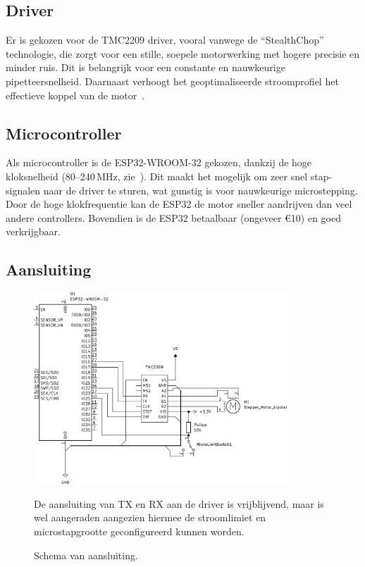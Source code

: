 \subsection{Driver}
Er is gekozen voor de TMC2209 driver, vooral vanwege de ``StealthChop'' technologie, die zorgt voor een stille, soepele motorwerking met hogere precisie en minder ruis. Dit is belangrijk voor een constante en nauwkeurige pipetteersnelheid. Daarnaast verhoogt het geoptimaliseerde stroomprofiel het effectieve koppel van de motor\ \cite{RN45}.

\subsection{Microcontroller}
Als microcontroller is de ESP32-WROOM-32 gekozen, dankzij de hoge kloksnelheid (80–240\,MHz, zie\ \cite{RN47}). Dit maakt het mogelijk om zeer snel stap-signalen naar de driver te sturen, wat gunstig is voor nauwkeurige microstepping. Door de hoge klokfrequentie kan de ESP32 de motor sneller aandrijven dan veel andere controllers. Bovendien is de ESP32 betaalbaar (ongeveer €10) en goed verkrijgbaar.
\subsection{Aansluiting}
\begin{figure}
    \centering
    \includegraphics[width=0.85\textwidth]{figures/Wiring_BW.png}
    \caption{Schema van aansluiting.}\label{fig:schematische_aansluiting}
    De aansluiting van TX en RX aan de driver is vrijblijvend, maar is wel aangeraden aangezien hiermee de stroomlimiet en microstapgrootte geconfigureerd kunnen worden.

\end{figure}

